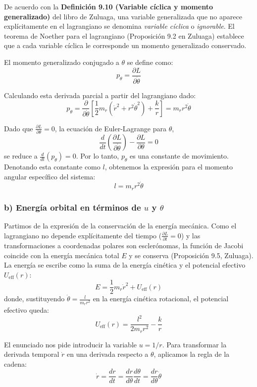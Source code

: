\documentclass[a4paper]{article}
\begin{document}
De acuerdo con la \textbf{Definición 9.10 (Variable cíclica y momento generalizado)} del libro de Zuluaga, una variable generalizada que no aparece explícitamente en el lagrangiano se denomina \textit{variable cíclica} o \textit{ignorable}. El teorema de Noether para el lagrangiano (Proposición 9.2 en Zuluaga) establece que a cada variable cíclica le corresponde un momento generalizado conservado. 

El momento generalizado conjugado a $\theta$ se define como:
$$p_\theta = \frac{\partial L}{\partial \dot{\theta}}$$

Calculando esta derivada parcial a partir del lagrangiano dado:
$$p_\theta = \frac{\partial}{\partial \dot{\theta}} \left[ \frac{1}{2}m_r \left(\dot{r}^2 + r^2\dot{\theta}^2\right) + \frac{k}{r} \right] = m_r r^2 \dot{\theta}$$

Dado que $\frac{\partial L}{\partial \theta} = 0$, la ecuación de Euler-Lagrange para $\theta$,
$$\frac{d}{dt}\left(\frac{\partial L}{\partial \dot{\theta}}\right) - \frac{\partial L}{\partial \theta} = 0$$
se reduce a $\frac{d}{dt}(p_\theta) = 0$. Por lo tanto, $p_\theta$ es una constante de movimiento. Denotando esta constante como $l$, obtenemos la expresión para el momento angular específico del sistema:
$$l = m_r r^2 \dot{\theta}$$

\subsubsection*{b) Energía orbital en términos de $u$ y $\theta$}

Partimos de la expresión de la conservación de la energía mecánica. Como el lagrangiano no depende explícitamente del tiempo ($\frac{\partial L}{\partial t} = 0$) y las transformaciones a coordenadas polares son esclerónomas, la función de Jacobi coincide con la energía mecánica total $E$ y se conserva (Proposición 9.5, Zuluaga). La energía se escribe como la suma de la energía cinética y el potencial efectivo $U_{\text{eff}}(r)$:
$$E = \frac{1}{2}m_r \dot{r}^2 + U_{\text{eff}}(r)$$
donde, sustituyendo $\dot{\theta} = \frac{l}{m_r r^2}$ en la energía cinética rotacional, el potencial efectivo queda:
$$U_{\text{eff}}(r) = \frac{l^2}{2m_r r^2} - \frac{k}{r}$$

El enunciado nos pide introducir la variable $u = 1/r$. Para transformar la derivada temporal $\dot{r}$ en una derivada respecto a $\theta$, aplicamos la regla de la cadena:
$$\dot{r} = \frac{dr}{dt} = \frac{dr}{d\theta} \frac{d\theta}{dt} = \frac{dr}{d\theta} \dot{\theta}$$
\end{document}
